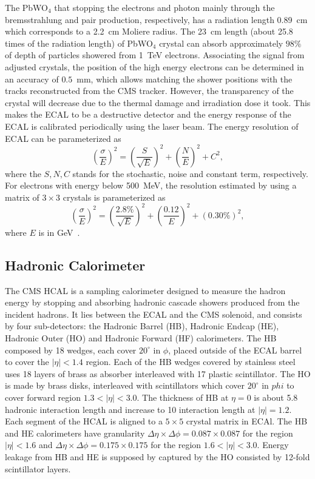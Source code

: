 The PbWO$_4$ that stopping the electrons and photon mainly through the bremsstrahlung and pair production, respectively, has a radiation length 0.89~cm which corresponds to a 2.2~cm Moliere radius. The 23~cm length (about 25.8 times of the radiation length) of PbWO$_4$ crystal can absorb approximately $98\%$ of depth of particles showered from 1~TeV electrons. Associating the signal from adjusted crystals, the position of the high energy electrons can be determined in an accuracy of $0.5$~mm, which allows matching the shower positions with the tracks reconstructed from the CMS tracker. However, the transparency of the crystal will decrease due to the thermal damage and irradiation dose it took. This makes the ECAL to be a destructive detector and the energy response of the ECAL is calibrated periodically using the laser beam. The energy resolution of ECAL can be parameterized as
\begin{equation}
	\left(\frac{\sigma}{E}\right)^2=\left(\frac{S}{\sqrt{E}}\right)^2+\left(\frac{N}{E}\right)^2+C^2,
\end{equation}
where the $S,N,C$ stands for the stochastic, noise and constant term, respectively. For electrons with energy below 500~MeV, the resolution estimated by using a matrix of $3\times3$ crystals is parameterized as
\begin{equation}
	\left(\frac{\sigma}{E}\right)^2=\left(\frac{2.8\%}{\sqrt{E}}\right)^2+\left(\frac{0.12}{E}\right)^2+(0.30\%)^2,
\end{equation}
where $E$ is in GeV~\cite{Chatrchyan:2008aa}. 


\subsection{Hadronic Calorimeter}
The CMS HCAL is a sampling calorimeter designed to measure the hadron energy by stopping and absorbing hadronic cascade showers produced from the incident hadrons. It lies between the ECAL and the CMS solenoid, and consists by four sub-detectors: the Hadronic Barrel (HB), Hadronic Endcap (HE), Hadronic Outer (HO) and Hadronic Forward (HF) calorimeters. The HB composed by  18 wedges, each cover $20^\circ$ in $\phi$, placed outside of the ECAL barrel to cover the $|\eta|<1.4$ region. Each of the HB wedges  covered by stainless steel uses 18 layers of brass as absorber interleaved with 17 plastic scintillator. The HO is made by brass disks, interleaved with scintillators which cover $20^\circ$ in $phi$ to cover forward region $1.3<|\eta|<3.0$. The thickness of HB at $\eta=0$ is about 5.8 hadronic interaction length and increase to 10 interaction length at $|\eta|= 1.2$. Each segment of the HCAL is aligned to a $5\times5$ crystal matrix in ECAl. The HB and HE calorimeters have granularity $\Delta\eta\times \Delta\phi=0.087\times0.087$ for the region $|\eta|<1.6$ and $\Delta\eta\times \Delta\phi=0.175\times0.175$ for the region $1.6<|\eta|<3.0$. Energy leakage from HB and HE is supposed by captured by the HO consisted by 12-fold scintillator layers.

